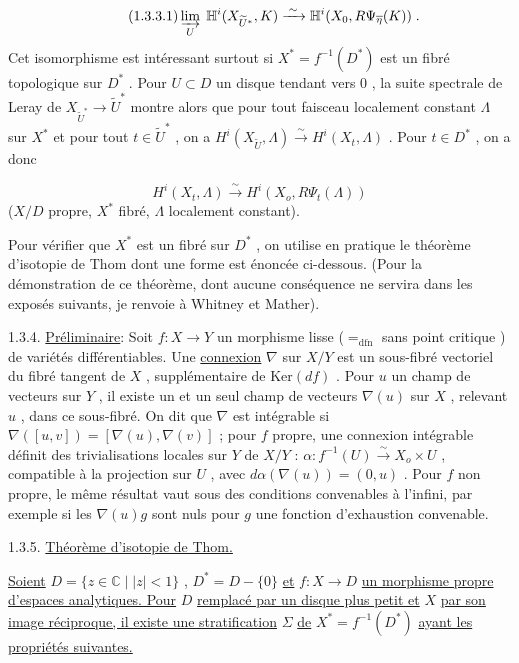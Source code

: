 \begin{equation}\tag{1.3.3.1}
\varinjlim_U \; \mathbb{H}^i(X_{\widetilde{U}^*} , K) \xrightarrow{\;\sim\;} \mathbb{H}^i(X_0, R\Psi_{\overline{\eta}} (K)) \; .
\end{equation}
Cet isomorphisme est intéressant surtout si $X^* = f^{-1}(D^*)$ est un fibré topologique sur $D^*$ . Pour $U \subset D$ un disque tendant vers $0$ , la suite spectrale
de Leray de $X_{\widetilde{U}^*} \to \widetilde{U}^*$ montre alors que pour tout faisceau localement constant $\Lambda$ sur $X^*$ et pour tout $t \in \widetilde{U}^*$ , on a $H^i(X_{\widetilde{U}}, \Lambda) \xrightarrow{\sim} H^i(X_t, \Lambda)$ . Pour $t \in D^*$ , on a donc

\begin{equation}\tag{1.3.3.2}
H^i(X_t, \Lambda) \xrightarrow{\sim} H^i(X_o, R\Psi_t(\Lambda))
\end{equation}
($X/D$ propre, $X^*$ fibré, $\Lambda$ localement constant).

Pour vérifier que $X^*$ est un fibré sur $D^*$ , on utilise en pratique le théorème d'isotopie de Thom dont une forme est énoncée ci-dessous. (Pour la démonstration de ce théorème, dont aucune conséquence ne servira dans les exposés suivants, je renvoie à Whitney et Mather).

1.3.4. \underline{Préliminaire}: Soit $f : X \to Y$ un morphisme lisse ($=_{\mathrm{dfn}}$ sans point critique ) de variétés différentiables. Une \underline{connexion} $\nabla$ sur $X/Y$ est un sous-fibré vectoriel du fibré tangent de $X$ , supplémentaire de $\mathrm{Ker}(df)$ . Pour $u$ un champ de vecteurs sur $Y$ , il existe un et un seul champ de vecteurs $\nabla(u)$ sur $X$ , relevant $u$ , dans ce sous-fibré. On dit que $\nabla$ est intégrable si $\nabla([u, v]) = [\nabla(u), \nabla(v)]$ ; pour $f$ propre, une connexion intégrable définit des trivialisations locales sur $Y$ de $X/Y$ : $\alpha : f^{-1}(U) \xrightarrow{\sim} X_o \times U$ , compatible à la projection sur $U$ , avec $d\alpha (\nabla(u)) = (0, u)$ . Pour $f$ non propre, le même résultat vaut sous des conditions convenables à l'infini, par exemple si les $\nabla(u)g$ sont nuls pour $g$ une fonction d'exhaustion convenable.


1.3.5. \underline{Théorème d'isotopie de Thom.}

\underline{Soient} $D = \{z \in \mathbb{C} \mid |z| < 1\}$ , $D^* = D-\{0\}$ \underline{et} $f : X \to D$ \underline{un morphisme propre d'espaces analytiques. Pour} $D$ \underline{remplacé par un disque plus petit et} $X$ \underline{par son image réciproque, il existe une stratification} $\Sigma$ \underline{de} $X^* = f^{-1}(D^*)$ \underline{ayant les propriétés suivantes.}

